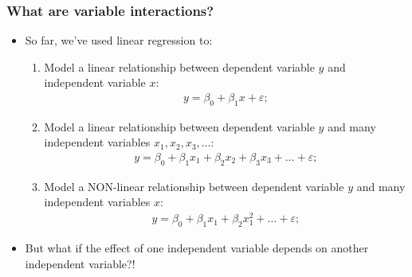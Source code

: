 \documentclass[aspectratio=169]{beamer}
\theoremstyle{principle}
\begin{document}
\begin{frame}
\frametitle{What are \textbf{variable interactions}?}

\begin{itemize}
\item So far, we've used linear regression to:
\begin{enumerate} 
\item Model a linear relationship between dependent variable $y$ and independent variable $x$:
\begin{align*}
y = \beta_0 + \beta_1x + \varepsilon;
\end{align*}
\item Model a linear relationship between dependent variable $y$ and many independent variables $x_1,x_2,x_3,\hdots$:
\begin{align*}
y = \beta_0 + \beta_1x_1 + \beta_2x_2 + \beta_3x_3 + \hdots + \varepsilon;
\end{align*}
\item Model a NON-linear relationship between dependent variable $y$ and many independent variables $x$:
\begin{align*}
y = \beta_0 + \beta_1x_1 + \beta_2x_1^2 + \hdots + \varepsilon;
\end{align*}
\end{enumerate}

\item But what if the effect of one independent variable depends on another independent variable?!

\end{itemize}

\end{frame}
\end{document}
